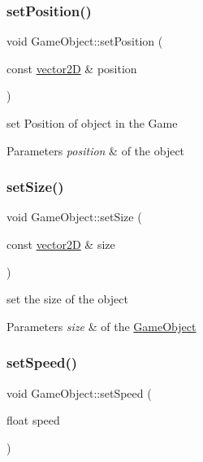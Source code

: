 \subsubsection{\texorpdfstring{set\+Position()}{setPosition()}}
{\footnotesize\ttfamily void Game\+Object\+::set\+Position (\begin{DoxyParamCaption}\item[{const \mbox{\hyperlink{classvector2_d}{vector2D}} \&}]{position }\end{DoxyParamCaption})}



set Position of object in the Game 


\begin{DoxyParams}{Parameters}
{\em position} & of the object \\
\hline
\end{DoxyParams}
\mbox{\label{class_game_object_aeb29555a9bb5cebab57da1960a5085f1}} 
\subsubsection{\texorpdfstring{set\+Size()}{setSize()}}
{\footnotesize\ttfamily void Game\+Object\+::set\+Size (\begin{DoxyParamCaption}\item[{const \mbox{\hyperlink{classvector2_d}{vector2D}} \&}]{size }\end{DoxyParamCaption})\hspace{0.3cm}{\ttfamily [inline]}}



set the size of the object 


\begin{DoxyParams}{Parameters}
{\em size} & of the \mbox{\hyperlink{class_game_object}{Game\+Object}} \\
\hline
\end{DoxyParams}
\mbox{\label{class_game_object_a80309e81b799b423a25e180044207114}} 
\subsubsection{\texorpdfstring{set\+Speed()}{setSpeed()}}
{\footnotesize\ttfamily void Game\+Object\+::set\+Speed (\begin{DoxyParamCaption}\item[{float}]{speed }\end{DoxyParamCaption})\hspace{0.3cm}{\ttfamily [inline]}}



